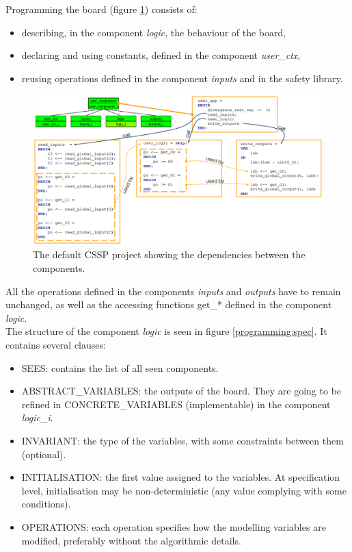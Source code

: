 Programming the board (figure \ref{programming:all})  consists of:
\begin{itemize}
    \item describing, in the component \textit{logic}, the behaviour of the board,
    \item declaring and using constants, defined in the component \textit{user\_ctx},
    \item reusing operations defined in the component \textit{inputs} and in the safety library.
\end{itemize}
\begin{figure}[ht]
\centering\includegraphics[scale=0.25]{Pictures/chapterProgramming/programming-all.png}
\caption{The default CSSP project showing the dependencies between the components. }
\label{programming:all}
\end{figure} 
All the operations defined in the components \textit{inputs} and \textit{outputs} have to remain unchanged, as well as the accessing functions get\_* defined in the component \textit{logic}.\\
The structure of the component \textit{logic} is seen in figure \ref{programming:spec}. It contains several clauses:
\begin{itemize}
    \item SEES: contains the list of all seen components.
    \item ABSTRACT\_VARIABLES: the outputs of the board. They are going to be refined in CONCRETE\_VARIABLES (implementable) in the component \textit{logic\_i}.
    \item INVARIANT: the type of the variables, with some constraints between them (optional).
    \item INITIALISATION: the first value assigned to the variables. At specification level, initialisation may be non-deterministic (any value complying with some conditions).
    \item OPERATIONS: each operation specifies how the modelling variables are modified, preferably without the algorithmic details.
\end{itemize}
